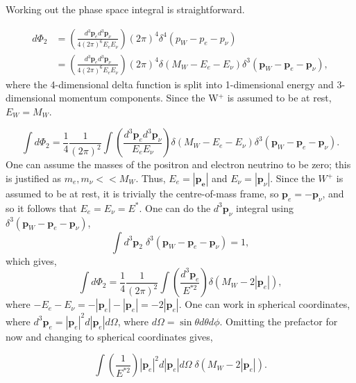 \documentclass[a4paper,11pt]{article}
\begin{document}
Working out the phase space integral is straightforward. 

\begin{equation}
	\begin{aligned}
		d\Phi_{2}&=	 \left(\frac{d^3\boldsymbol{p}_e d^3\boldsymbol{p}_\nu}{4(2\pi)^6E_eE_\nu}\right) (2\pi)^4 \delta^4 (p_W -  p_e - p_\nu) \\
		&= \left(\frac{d^3\boldsymbol{p}_e d^3\boldsymbol{p}_\nu}{4(2\pi)^6E_eE_\nu}\right) (2\pi)^4 \delta(M_W - E_e - E_\nu)\delta^3 (\boldsymbol{p}_W -  \boldsymbol{p}_e - \boldsymbol{p}_\nu),
	\end{aligned}
\end{equation}
where the 4-dimensional delta function is split into 1-dimensional energy and 3-dimensional momentum components. Since the W$^+$ is assumed to be at rest, $E_W = M_W$.


$$
\int d\Phi_{2} =  \frac{1}{4} \frac{1}{(2\pi)^2}\int  \left(\frac{d^3\boldsymbol{p}_e d^3\boldsymbol{p}_\nu}{E_eE_\nu}\right) \delta(M_W - E_e - E_\nu)\delta^3 (\boldsymbol{p}_W -  \boldsymbol{p}_e - \boldsymbol{p}_\nu).
$$
One can assume the masses of the positron and electron neutrino to be zero; this is justified as $m_e, m_\nu << M_W$. Thus, $E_e = |\boldsymbol{p_e}| $ and $E_\nu = |\boldsymbol{p}_\nu| $. Since the $W^+$ is assumed to be at rest, it is trivially the centre-of-mass frame, so $\boldsymbol{p}_e = - \boldsymbol{p}_\nu$,  and so it follows that $E_e = E_\nu= E^*$. One can do the  $d^3\boldsymbol{p}_\nu$ integral using $\delta^3 (\boldsymbol{p}_W -  \boldsymbol{p}_e - \boldsymbol{p}_\nu)$, 
$$
\int d^3\boldsymbol{p}_2\; \delta^3 (\boldsymbol{p}_W -  \boldsymbol{p}_e - \boldsymbol{p}_\nu) = 1,
$$
which gives,
$$
\int d\Phi_{2} = \frac{1}{4} \frac{1}{(2\pi)^2} \int  \left(\frac{d^3\boldsymbol{p}_e}{E^{*2}}\right)\delta(M_W - 2|\boldsymbol{p}_e|),
$$
where $-E_e - E_\nu= -|\boldsymbol{p}_e|-|\boldsymbol{p}_e| = -2|\boldsymbol{p}_e|$.
One can work in spherical coordinates, where $d^3 \boldsymbol{p}_e = |\boldsymbol{p}_e|^2 d|\boldsymbol{p}_e| d\Omega$, where $d\Omega = \sin\theta d\theta d\phi$. Omitting the prefactor for now and changing to spherical coordinates gives, 

\begin{equation}
	\int \left(\frac{1}{E^{*2}}\right) |\boldsymbol{p}_e|^2 d|\boldsymbol{p}_e| d\Omega \; \delta(M_W - 2|\boldsymbol{p}_e|).
\end{equation}
\end{document}
